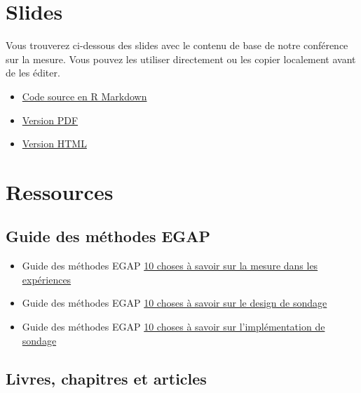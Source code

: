 \documentclass[
  12pt,
]{book}
\begin{document}
\hypertarget{slides-6}{%
\section{Slides}\label{slides-6}}

Vous trouverez ci-dessous des slides avec le contenu de base de notre conférence sur la mesure. Vous pouvez les utiliser directement ou les copier localement avant de les éditer.

\begin{itemize}
\item
  \href{https://egap.github.io/learningdays-resources/Slides/measurement-slides.Rmd}{Code source en R Markdown}
\item
  \href{https://egap.github.io/learningdays-resources/Slides/measurement-slides.pdf}{Version PDF}
\item
  \href{https://egap.github.io/learningdays-resources/Slides/measurement-slides.html}{Version HTML}
\end{itemize}

\hypertarget{ressources-6}{%
\section{Ressources}\label{ressources-6}}

\hypertarget{guide-des-muxe9thodes-egap-6}{%
\subsection{Guide des méthodes EGAP}\label{guide-des-muxe9thodes-egap-6}}

\begin{itemize}
\item
  Guide des méthodes EGAP \href{https://egap.org/resource/10-things-to-know-about-measurement-in-experiments/}{10 choses à savoir sur la mesure dans les expériences}
\item
  Guide des méthodes EGAP \href{https://egap.org/resource/10-things-to-know-about-survey-design/}{10 choses à savoir sur le design de sondage}
\item
  Guide des méthodes EGAP \href{https://egap.org/resource/10-things-to-know-about-survey-implementation/}{10 choses à savoir sur l'implémentation de sondage}
\end{itemize}

\hypertarget{livres-chapitres-et-articles-4}{%
\subsection{Livres, chapitres et articles}\label{livres-chapitres-et-articles-4}}
\end{document}
